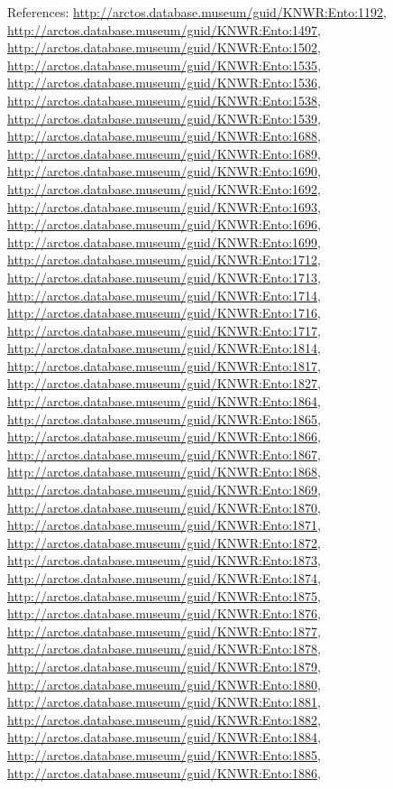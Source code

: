 \documentclass[9pt, article]{memoir}
\begin{document}
\begin{multicols}{2}
\vspace{6pt}References: 
\url{http://arctos.database.museum/guid/KNWR:Ento:1192}, 
\url{http://arctos.database.museum/guid/KNWR:Ento:1497}, 
\url{http://arctos.database.museum/guid/KNWR:Ento:1502}, 
\url{http://arctos.database.museum/guid/KNWR:Ento:1535}, 
\url{http://arctos.database.museum/guid/KNWR:Ento:1536}, 
\url{http://arctos.database.museum/guid/KNWR:Ento:1538}, 
\url{http://arctos.database.museum/guid/KNWR:Ento:1539}, 
\url{http://arctos.database.museum/guid/KNWR:Ento:1688}, 
\url{http://arctos.database.museum/guid/KNWR:Ento:1689}, 
\url{http://arctos.database.museum/guid/KNWR:Ento:1690}, 
\url{http://arctos.database.museum/guid/KNWR:Ento:1692}, 
\url{http://arctos.database.museum/guid/KNWR:Ento:1693}, 
\url{http://arctos.database.museum/guid/KNWR:Ento:1696}, 
\url{http://arctos.database.museum/guid/KNWR:Ento:1699}, 
\url{http://arctos.database.museum/guid/KNWR:Ento:1712}, 
\url{http://arctos.database.museum/guid/KNWR:Ento:1713}, 
\url{http://arctos.database.museum/guid/KNWR:Ento:1714}, 
\url{http://arctos.database.museum/guid/KNWR:Ento:1716}, 
\url{http://arctos.database.museum/guid/KNWR:Ento:1717}, 
\url{http://arctos.database.museum/guid/KNWR:Ento:1814}, 
\url{http://arctos.database.museum/guid/KNWR:Ento:1817}, 
\url{http://arctos.database.museum/guid/KNWR:Ento:1827}, 
\url{http://arctos.database.museum/guid/KNWR:Ento:1864}, 
\url{http://arctos.database.museum/guid/KNWR:Ento:1865}, 
\url{http://arctos.database.museum/guid/KNWR:Ento:1866}, 
\url{http://arctos.database.museum/guid/KNWR:Ento:1867}, 
\url{http://arctos.database.museum/guid/KNWR:Ento:1868}, 
\url{http://arctos.database.museum/guid/KNWR:Ento:1869}, 
\url{http://arctos.database.museum/guid/KNWR:Ento:1870}, 
\url{http://arctos.database.museum/guid/KNWR:Ento:1871}, 
\url{http://arctos.database.museum/guid/KNWR:Ento:1872}, 
\url{http://arctos.database.museum/guid/KNWR:Ento:1873}, 
\url{http://arctos.database.museum/guid/KNWR:Ento:1874}, 
\url{http://arctos.database.museum/guid/KNWR:Ento:1875}, 
\url{http://arctos.database.museum/guid/KNWR:Ento:1876}, 
\url{http://arctos.database.museum/guid/KNWR:Ento:1877}, 
\url{http://arctos.database.museum/guid/KNWR:Ento:1878}, 
\url{http://arctos.database.museum/guid/KNWR:Ento:1879}, 
\url{http://arctos.database.museum/guid/KNWR:Ento:1880}, 
\url{http://arctos.database.museum/guid/KNWR:Ento:1881}, 
\url{http://arctos.database.museum/guid/KNWR:Ento:1882}, 
\url{http://arctos.database.museum/guid/KNWR:Ento:1884}, 
\url{http://arctos.database.museum/guid/KNWR:Ento:1885}, 
\url{http://arctos.database.museum/guid/KNWR:Ento:1886}, 

\end{multicols}
\end{document}
